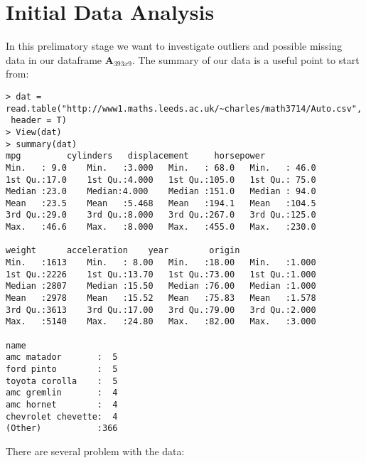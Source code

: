 \documentclass[11pt]{article} %
\begin{document}
\section{Initial Data Analysis}
In this prelimatory stage we want to investigate outliers and possible missing data in our dataframe $\textbf{A}_{393x9}$. The summary of our data is a useful point to start from:
\begin{lstlisting}
> dat = read.table("http://www1.maths.leeds.ac.uk/~charles/math3714/Auto.csv",
 header = T)
> View(dat)
> summary(dat)
mpg 		cylinders	displacement	 horsepower
Min.   : 9.0	Min.   :3.000	Min.   : 68.0 	Min.   : 46.0
1st Qu.:17.0	1st Qu.:4.000	1st Qu.:105.0	1st Qu.: 75.0
Median :23.0	Median:4.000	Median :151.0	Median : 94.0
Mean   :23.5	Mean   :5.468	Mean   :194.1	Mean   :104.5
3rd Qu.:29.0	3rd Qu.:8.000	3rd Qu.:267.0	3rd Qu.:125.0
Max.   :46.6	Max.   :8.000	Max.   :455.0	Max.   :230.0

weight		acceleration	year		origin
Min.   :1613	Min.   : 8.00	Min.   :18.00	Min.   :1.000
1st Qu.:2226	1st Qu.:13.70	1st Qu.:73.00	1st Qu.:1.000
Median :2807	Median :15.50	Median :76.00	Median :1.000
Mean   :2978	Mean   :15.52	Mean   :75.83	Mean   :1.578
3rd Qu.:3613	3rd Qu.:17.00	3rd Qu.:79.00	3rd Qu.:2.000
Max.   :5140	Max.   :24.80	Max.   :82.00	Max.   :3.000

name
amc matador       :  5
ford pinto        :  5
toyota corolla    :  5
amc gremlin       :  4
amc hornet        :  4
chevrolet chevette:  4
(Other)           :366
\end{lstlisting}
There are several problem with the data:
\end{document}
